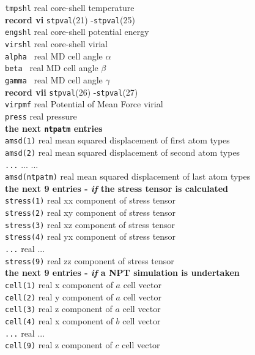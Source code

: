 \begin{tabbing}
\> {\tt tmpshl} \> real \> core-shell temperature\\
{\bf record vi} {\tt stpval}(21) -{\tt stpval}(25)\\
\> {\tt engshl} \> real \> core-shell potential energy\\
\> {\tt virshl} \> real \> core-shell virial\\
\> {\tt alpha } \> real \> MD cell angle $\alpha$\\
\> {\tt beta } \> real \> MD cell angle $\beta$\\
\> {\tt gamma } \> real \> MD cell angle $\gamma$\\
{\bf record vii} {\tt stpval}(26) -{\tt stpval}(27)\\
\> {\tt virpmf} \> real \> Potential of Mean Force virial\\
\> {\tt press} \> real \> pressure\\
{\bf the next {\tt ntpatm} entries}\\
\> {\tt amsd(1)} \> real \> mean squared displacement of first atom
types\\
\> {\tt amsd(2)} \> real \> mean squared displacement of second atom
types\\
\> {\tt ...} \> ... \> ... \\
\> {\tt amsd(ntpatm)} \> real \> mean squared displacement of last
atom types\\
{\bf the next 9 entries - {\em if} the stress tensor is calculated}\\
\> {\tt stress(1)} \> real \> xx component of stress tensor\\
\> {\tt stress(2)} \> real \> xy component of stress tensor\\
\> {\tt stress(3)} \> real \> xz component of stress tensor\\
\> {\tt stress(4)} \> real \> yx component of stress tensor\\
\> {\tt ...} \> real \> ... \\
\> {\tt stress(9)} \> real \> zz component of stress tensor\\
{\bf the next 9 entries - {\em if} a NPT simulation is undertaken}\\
\> {\tt cell(1)} \> real \> x component of $a$ cell vector\\
\> {\tt cell(2)} \> real \> y component of $a$ cell vector\\
\> {\tt cell(3)} \> real \> z component of $a$ cell vector\\
\> {\tt cell(4)} \> real \> x component of $b$ cell vector\\
\> {\tt ...} \> real \> ... \\
\> {\tt cell(9)} \> real \> z component of $c$ cell vector\\
\end{tabbing}


